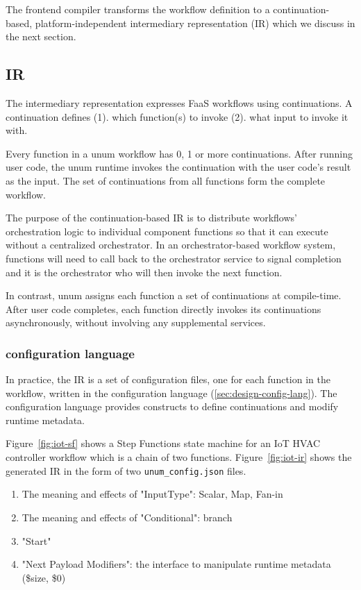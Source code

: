 The frontend compiler transforms the workflow definition to a
continuation-based, platform-independent intermediary representation (IR)
which we discuss in the next section.



\subsection{\name{} IR}

The \name{} intermediary representation expresses FaaS workflows using
continuations. A continuation defines (1). which function(s) to invoke (2).
what input to invoke it with.

Every function in a unum workflow has 0, 1 or more continuations. After
running user code, the unum runtime invokes the continuation with the user
code's result as the input. The set of continuations from all functions form
the complete workflow.

The purpose of the continuation-based IR is to distribute workflows'
orchestration logic to individual component functions so that it can execute
without a centralized orchestrator. In an orchestrator-based workflow system,
functions will need to call back to the orchestrator service to signal
completion and it is the orchestrator who will then invoke the next function.

In contrast, unum assigns each function a set of continuations at
compile-time. After user code completes, each function directly invokes its
continuations asynchronously, without involving any supplemental services.

\subsubsection{\name{} configuration language}

In practice, the \name{} IR is a set of configuration files, one for each
function in the workflow, written in the \name{} configuration language
(\ref{sec:design-config-lang}). The configuration language provides constructs
to define continuations and modify runtime metadata.

Figure~\ref{fig:iot-sf} shows a Step Functions state machine for an IoT HVAC
controller workflow which is a chain of two functions. Figure~\ref{fig:iot-ir}
shows the generated IR in the form of two \texttt{unum\_config.json} files.

\begin{enumerate}

	\item The meaning and effects of "InputType": Scalar, Map, Fan-in

	\item The meaning and effects of "Conditional": branch

	\item "Start"

	\item "Next Payload Modifiers": the interface to manipulate runtime metadata (\$size, \$0)

\end{enumerate}


